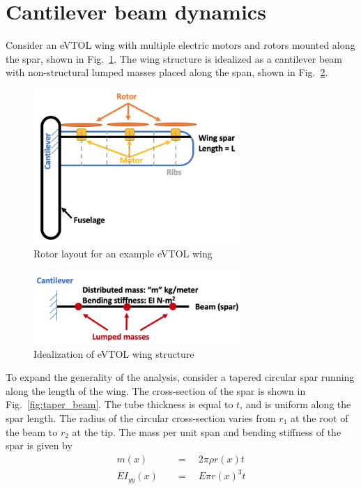 \appendix
\section{Cantilever beam dynamics}

Consider an eVTOL wing with multiple electric motors and rotors mounted along the spar, shown in Fig.~\ref{fig:wing_diagram}. The wing structure is idealized as a cantilever beam with non-structural lumped masses placed along the span, shown in Fig.~\ref{fig:cantilever}. 

\begin{figure}[H]
     \centering
         \includegraphics[width=0.7\textwidth]{images/wing_diagram.png}
        \caption{Rotor layout for an example eVTOL wing}
         \label{fig:wing_diagram}
\end{figure}

\begin{figure}[H]
         \centering
         \includegraphics[width=0.7\textwidth]{images/cantilever.png}
        \caption{Idealization of eVTOL wing structure}
         \label{fig:cantilever}
\end{figure}

To expand the generality of the analysis, consider a tapered circular spar running along the length of the wing. The cross-section of the spar is shown in Fig.~\ref{fig:taper_beam}. The tube thickness is equal to $t$, and is uniform along the spar length. The radius of the circular cross-section varies from $r_1$ at the root of the beam to $r_2$ at the tip. The mass per unit span and bending stiffness of the spar is given by 
\begin{align*}
m(x) \quad &= \quad 2 \pi \rho r(x) t \\
EI_{yy}(x) \quad &= \quad E \pi r(x)^3 t
\end{align*}

